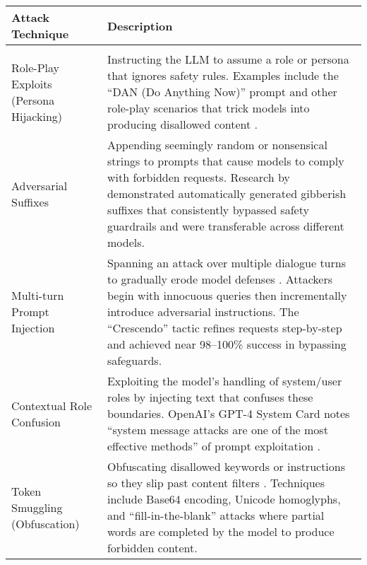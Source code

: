 \begin{longtable}{>{\raggedright\arraybackslash}p{}>{\raggedright\arraybackslash}p{}}
    \toprule
    \textbf{Attack Technique} & \textbf{Description} \\
    \midrule
    \endhead
    
    \midrule
    \multicolumn{2}{r}{\textit{Continued on next page}} \\
    \endfoot
    
    \bottomrule
    \endlastfoot
    
    Role-Play Exploits (Persona Hijacking) & Instructing the LLM to assume a role or persona that ignores safety rules. Examples include the ``DAN (Do Anything Now)'' prompt and other role-play scenarios that trick models into producing disallowed content \citep{ArthurBlog2023}. \\
    
    Adversarial Suffixes & Appending seemingly random or nonsensical strings to prompts that cause models to comply with forbidden requests. Research by \citet{Zou2023} demonstrated automatically generated gibberish suffixes that consistently bypassed safety guardrails and were transferable across different models. \\
    
    Multi-turn Prompt Injection & Spanning an attack over multiple dialogue turns to gradually erode model defenses \citep{OpenReview2023, Oneshot2024}. Attackers begin with innocuous queries then incrementally introduce adversarial instructions. The ``Crescendo'' tactic refines requests step-by-step and achieved near 98--100\% success in bypassing safeguards. \\
    
    Contextual Role Confusion & Exploiting the model's handling of system/user roles by injecting text that confuses these boundaries. OpenAI's GPT-4 System Card notes ``system message attacks are one of the most effective methods'' of prompt exploitation \citep{RobustIntelligence2023}. \\
    
    Token Smuggling (Obfuscation) & Obfuscating disallowed keywords or instructions so they slip past content filters \citep{LearnPrompting2023a, LearnPrompting2023b}. Techniques include Base64 encoding, Unicode homoglyphs, and ``fill-in-the-blank'' attacks where partial words are completed by the model to produce forbidden content. \\
    

\end{longtable}
